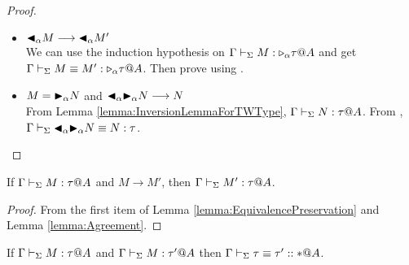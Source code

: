 \begin{proof}
\begin{itemize}
            \begin{itemize}
                \item \( {\mathop{\blacktriangleleft}}_{\alpha}M \longrightarrow {\mathop{\blacktriangleleft}}_{\alpha}M' \) \\
                    We can use the induction hypothesis on \( \G\V M:\TW_{\alpha}\tau@A \) and get \( \G \V M \E M' : \TW_{\alpha}\tau@A \). Then prove using \QTBL.
                \item \( M = {\mathop{\blacktriangleright}}_\alpha N \) and \( {\mathop{\blacktriangleleft}}_{\alpha}{\mathop{\blacktriangleright}}_\alpha N \longrightarrow N \) \\
                    From Lemma \ref{lemma:InversionLemmaForTWType}, \( \Gamma \vdash_\Sigma N
                    : \tau @ A \). From \QTBLTB, \( \Gamma \vdash_\Sigma
                    {\mathop{\blacktriangleleft}}_{\alpha}{\mathop{\blacktriangleright}}_\alpha N \equiv N : \tau \).
            \end{itemize}
    \end{itemize}
\end{proof}

\begin{theorem}
    \label{theorem:TypePreservation}
    If \( \Gamma \vdash_\Sigma M : \tau @ A \) and \( M \longrightarrow M' \), then \( \Gamma \vdash_\Sigma M' : \tau @ A \).
\end{theorem}

\begin{proof}
    From the first item of Lemma \ref{lemma:EquivalencePreservation} and Lemma \ref{lemma:Agreement}.
\end{proof}

\begin{lemma}
    \label{lemma:TypesOfTheSameTerm}
    If \( \Gamma \vdash_\Sigma M : \tau @ A \) and \( \Gamma \vdash_\Sigma M : \tau' @ A \) then \( \Gamma \vdash_\Sigma \tau \equiv \tau' :: * @ A \).
\end{lemma}

